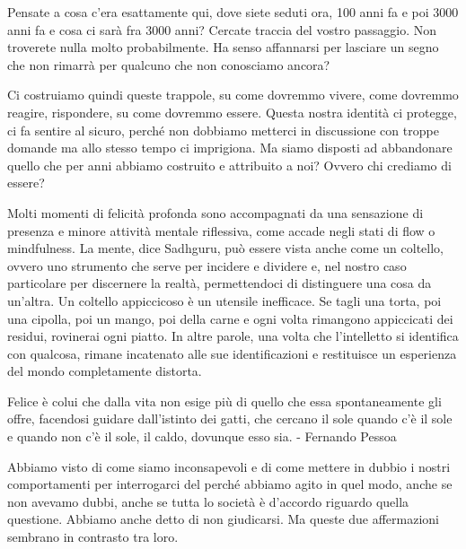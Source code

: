 \documentclass[12pt]{book} %
\begin{document}
\begin{mdframed}[linewidth=1pt]
Pensate a cosa c'era esattamente qui, dove siete seduti ora, 100 anni fa e poi 3000 anni fa e cosa ci sarà fra 3000 anni? Cercate traccia del vostro passaggio. Non troverete nulla molto probabilmente. Ha senso affannarsi per lasciare un segno che non rimarrà per qualcuno che non conosciamo ancora?
\end{mdframed}

Ci costruiamo quindi queste trappole, su come dovremmo vivere, come dovremmo reagire, rispondere, su come dovremmo
essere. Questa nostra identità ci protegge, ci fa sentire al sicuro, perché non dobbiamo metterci in discussione con
troppe domande ma allo stesso tempo ci imprigiona. Ma siamo disposti ad abbandonare quello che per anni abbiamo
costruito e attribuito a noi? Ovvero chi crediamo di essere? 

Molti momenti di felicità profonda sono accompagnati da una sensazione di presenza e minore attività mentale riflessiva, come accade negli stati di flow o mindfulness. La mente, dice Sadhguru, può essere vista anche come un
coltello, ovvero uno strumento che serve per incidere e dividere e, nel nostro caso particolare per discernere la
realtà, permettendoci di distinguere una cosa da un'altra. Un coltello appiccicoso è un utensile inefficace.
Se tagli una torta, poi una cipolla, poi un mango, poi della carne e ogni volta rimangono appiccicati dei residui,
rovinerai ogni piatto. In altre parole, una volta che l'intelletto si identifica con qualcosa, rimane incatenato alle
sue identificazioni e restituisce un esperienza del mondo completamente distorta.

Felice è colui che dalla vita non esige più di quello che essa spontaneamente gli offre, facendosi guidare dall'istinto
dei gatti, che cercano il sole quando c'è il sole e quando non c'è il sole, il caldo, dovunque esso sia. - Fernando
Pessoa

Abbiamo visto di come siamo inconsapevoli e di come mettere in dubbio i nostri comportamenti per interrogarci del perché abbiamo agito in quel modo, anche se non avevamo dubbi, anche se tutta lo società è
d'accordo riguardo quella questione. Abbiamo anche detto di non giudicarsi. Ma queste due
affermazioni sembrano in contrasto tra loro.
\end{document}
